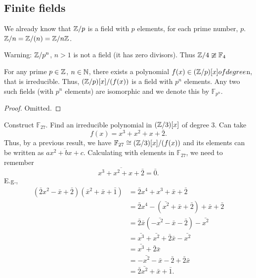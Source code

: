 \documentclass[10pt, a4paper]{article}
\begin{document}
\subsection{Finite fields}
We already know that $\mathbb{Z} / p$ is a field with $p$ elements,
for each prime number,
$p$.
$\mathbb{Z} / n = \mathbb{Z} / (n) = \mathbb{Z} / n\mathbb{Z}$.

Warning:
$\mathbb{Z} / p ^ n$,
$n > 1$ is not a field
(it has zero divisors).
Thus $\mathbb{Z} / 4 \ncong \mathbb{F}_4$

\begin{theorem}
    For any prime $p \in \mathbb{Z}$,
    $n \in \mathbb{N}$,
    there exists a polynomial $f(x) \in (\mathbb{Z} / p)[x] of degree $n,
    that is irreducible.
    Thus,
    $(\mathbb{Z} / p)[x] / (f(x))$ is a field with $p ^ n$ elements.
    Any two such fields
    (with $p ^ n$ elements)
    are isomorphic and we denote this by $\mathbb{F}_{p ^ n}$.

    \begin{proof}
        Omitted.
    \end{proof}
\end{theorem}

\begin{example}
    Construct $\mathbb{F}_{27}$.
    Find an irreducible polynomial in $(\mathbb{Z} / 3)[x]$ of degree $3$.
    Can take
    \[
    f(x) = x ^ 3 + x ^ 2 + x + \bar{2}.
    \]
    Thus,
    by a previous result,
    we have $\mathbb{F}_{27} \cong (\mathbb{Z} / 3)[x] / (f(x))$ and its elements can be written as $\overline{ax ^ 2 + bx + c}$.
    Calculating with elements in $\mathbb{F}_{27}$,
    we need to remember
    \[
    \overline{x ^ 3 + x ^ 2 + x + \bar{2}} = \bar{0}.
    \]
    E.g.,
    \begin{align*}
        (\bar{2}x ^ 2 - \bar{x} + \bar{2})(\bar{x} ^ 2 + \bar{x} + \bar{1}) &= \bar{2}x ^ 4 + x ^ 3 + \bar{x} + \bar{2} \\
        &= \bar{2}x ^ 4 - (\bar{x ^ 2} + \bar{x} + \bar{2}) + \bar{x} + \bar{2} \\
        &= \bar{2}\bar{x}(-\bar{x ^ 2} - \bar{x} - \bar{2}) - \bar{x ^ 2} \\
        &= \bar{x ^ 3} + \bar{x ^ 2} + \bar{2}\bar{x} - \bar{x ^ 2} \\
        &= \bar{x ^ 3} + \bar{2}\bar{x} \\
        &= -\bar{x ^ 2} - \bar{x} - \bar{2} + \bar{2}\bar{x} \\
        &= \bar{2}\bar{x ^ 2} + \bar{x} + \bar{1}.
    \end{align*}
\end{example}
\end{document}

